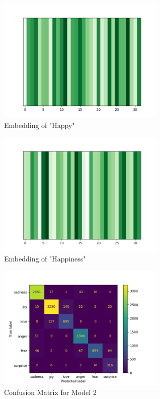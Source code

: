 \documentclass[11pt]{article}
\begin{document}
\begin{figure}
    \begin{center}
    \includegraphics[width=8cm]{happy.png}
    \caption{Embedding of "Happy"}
    \label{fig:height}
    \end{center}
\end{figure}

\begin{figure}
    \begin{center}
    \includegraphics[width=8cm]{happiness.png}
    \caption{Embedding of "Happiness"}
    \label{fig:height}
    \end{center}
\end{figure}

\begin{figure}
    \begin{center}
    \includegraphics[width=8cm]{cm.png}
    \caption{Confusion Matrix for Model 2}
    \label{fig:height}
    \end{center}
\end{figure}
\end{document}
